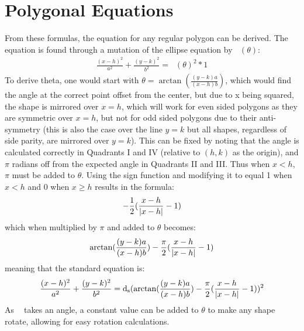 \documentclass[11pt]{article}
\DeclareMathOperator{\custd}{\mathrm{d}_s}
\DeclareMathOperator{\custdsq}{\mathrm{d}_s}
\DeclarePairedDelimiter\abs{\lvert}{\rvert}%
\begin{document}
\section{Polygonal Equations}
From these formulas, the equation for any regular polygon can be derived. The equation is found through a mutation of the ellipse equation by \(\custd(\theta)\):
\begin{gather*}
\frac{(x-h)^2}{a^2}+\frac{(y-k)^2}{b^2}=\custd(\theta)^2*1
\end{gather*}
To derive theta, one would start with \(\theta=\arctan(\frac{(y-k)a}{(x-h)b})\), which would find the angle at the correct point offset from the center, but due to x being squared, the shape is mirrored over \(x=h\), which will work for even sided polygons as they are symmetric over \(x=h\), but not for odd sided polygons due to their anti-symmetry (this is also the case over the line \(y=k\) but all shapes, regardless of side parity, are mirrored over \(y=k\)). This can be fixed by noting that the angle is calculated correctly in Quadrants I and IV (relative to \((h,k)\) as the origin), and \(\pi\) radians off from the expected angle in Quadrants II and III. Thus when \(x<h\), \(\pi\) must be added to \(\theta\). Using the sign function and modifying it to equal 1 when \(x<h\) and 0 when \(x\geq h\) results in the formula:
\begin{gather*}
-\frac{1}{2}(\frac{x-h}{\abs{x-h}}-1)
\end{gather*}
which when multiplied by \(\pi\) and added to \(\theta\) becomes:
\begin{gather*}
\arctan(\frac{(y-k)a}{(x-h)b})-\frac{\pi}{2}(\frac{x-h}{\abs{x-h}}-1)
\end{gather*}
meaning that the standard equation is:
\begin{gather*}
\frac{(x-h)^2}{a^2}+\frac{(y-k)^2}{b^2}=\custdsq(\arctan(\frac{(y-k)a}{(x-h)b})-\frac{\pi}{2}(\frac{x-h}{\abs{x-h}}-1))^2
\end{gather*}
As \(\custd\) takes an angle, a constant value can be added to \(\theta\) to make any shape rotate, allowing for easy rotation calculations.
\end{document}
